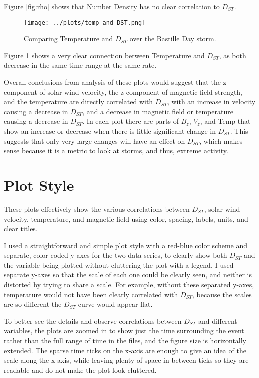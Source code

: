 \documentclass[12pt, letterpaper]{article}
\begin{document}
Figure \ref{fig:rho} shows that Number Density has no clear correlation to $D_{ST}$.


\begin{figure}[!ht]
  \centering
  \texttt{[image: ../plots/temp\_and\_DST.png]}
  \caption{Comparing Temperature and $D_{ST}$ over the Bastille Day storm.}
  \label{fig:temp}
\end{figure}

Figure \ref{fig:temp} shows a very clear connection between Temperature and  $D_{ST}$, as both decrease in the same time range at the same rate.

Overall conclusions from analysis of these plots would suggest that the z-component of solar wind velocity, the z-component of magnetic field strength, and the temperature are directly correlated with $D_{ST}$, with an increase in velocity causing a decrease in $D_{ST}$, and a decrease in magnetic field or temperature causing a decrease in $D_{ST}$. In each plot there are parts of $B_{z}$, $V_{z}$, and Temp that show an increase or decrease when there is little significant change in $D_{ST}$. This suggests that only very large changes will have an effect on $D_{ST}$, which makes sense because it is a metric to look at storms, and thus, extreme activity.


\section{Plot Style}

These plots effectively show the various correlations between $D_{ST}$, solar wind velocity, temperature, and magnetic field using color, spacing, labels, units, and clear titles.

I used a straightforward and simple plot style with a red-blue color scheme and separate, color-coded y-axes for the two data series, to clearly show both $D_{ST}$ and the variable being plotted without cluttering the plot with a legend. I used separate y-axes so that the scale of each one could be clearly seen, and neither is distorted by trying to share a scale. For example, without these separated y-axes, temperature would not have been clearly correlated with $D_{ST}$, because the scales are so different the $D_{ST}$ curve would appear flat.

To better see the details and observe correlations between $D_{ST}$ and different variables, the plots are zoomed in to show just the time surrounding the event rather than the full range of time in the files, and the figure size is horizontally extended. The sparse time ticks on the x-axis are enough to give an idea of the scale along the x-axis, while leaving plenty of space in between ticks so they are readable and do not make the plot look cluttered.
\end{document}
